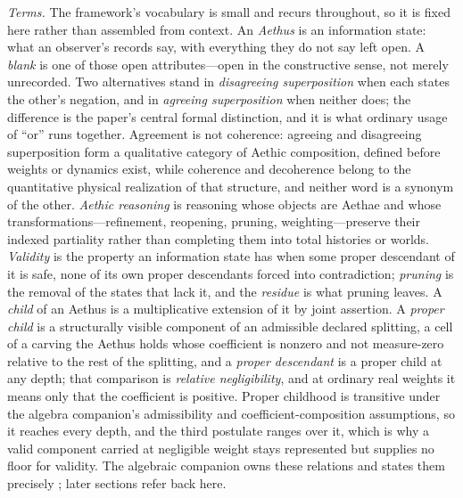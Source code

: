 \documentclass[11pt]{article}
\theoremstyle{definition}
\newcommand{\Aethus}{Aethus}
\begin{document}
\textit{Terms.} The framework's vocabulary is small and recurs throughout, so it is fixed here rather than assembled from context. An \emph{Aethus} is an information state: what an observer's records say, with everything they do not say left open. A \emph{blank} is one of those open attributes---open in the constructive sense, not merely unrecorded. Two alternatives stand in \emph{disagreeing superposition} when each states the other's negation, and in \emph{agreeing superposition} when neither does; the difference is the paper's central formal distinction, and it is what ordinary usage of ``or'' runs together. Agreement is not coherence: agreeing and disagreeing superposition form a qualitative category of Aethic composition, defined before weights or dynamics exist, while coherence and decoherence belong to the quantitative physical realization of that structure, and neither word is a synonym of the other. \emph{Aethic reasoning} is reasoning whose objects are Aethae and whose transformations---refinement, reopening, pruning, weighting---preserve their indexed partiality rather than completing them into total histories or worlds. \emph{Validity} is the property an information state has when some proper descendant of it is safe, none of its own proper descendants forced into contradiction; \emph{pruning} is the removal of the states that lack it, and the \emph{residue} is what pruning leaves. A \emph{child} of an \Aethus{} is a multiplicative extension of it by joint assertion. A \emph{proper child} is a structurally visible component of an admissible declared splitting, a cell of a carving the \Aethus{} holds whose coefficient is nonzero and not measure-zero relative to the rest of the splitting, and a \emph{proper descendant} is a proper child at any depth; that comparison is \emph{relative negligibility}, and at ordinary real weights it means only that the coefficient is positive. Proper childhood is transitive under the algebra companion's admissibility and coefficient-composition assumptions, so it reaches every depth, and the third postulate ranges over it, which is why a valid component carried at negligible weight stays represented but supplies no floor for validity. The algebraic companion owns these relations and states them precisely \cite{AethusTree}; later sections refer back here.
\end{document}
